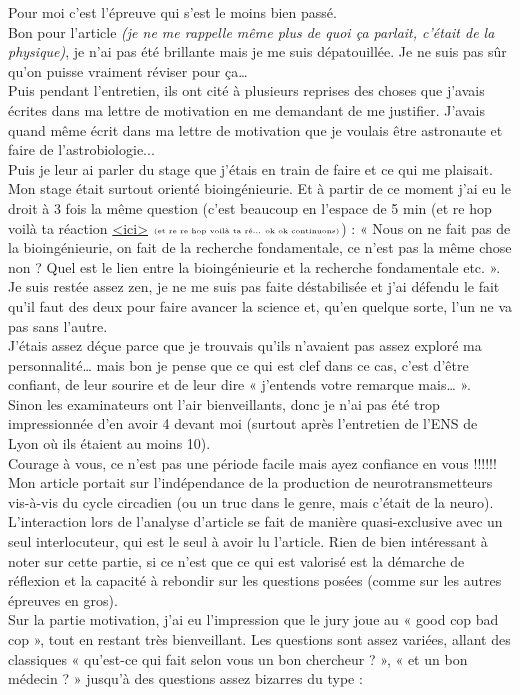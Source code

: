 \lettrine{{\color{yellow!80!black} \oldpilcrowfive}}{}
Pour moi c’est l’épreuve qui s’est le moins bien passé.\\
Bon pour l’article \textit{(je ne me rappelle même plus de quoi ça parlait, c’était de la physique)}, je n’ai pas été
brillante mais je me suis dépatouillée. Je ne suis pas sûr qu’on puisse vraiment réviser pour ça…\\
Puis pendant l’entretien, ils ont cité à plusieurs reprises des choses que j’avais écrites dans ma lettre de motivation en me demandant de me justifier. J’avais quand même écrit dans ma lettre de motivation que je voulais être astronaute et faire de l’astrobiologie... \\
Puis je leur ai parler du stage que j’étais en train de faire et ce qui me plaisait. Mon stage était surtout orienté bioingénieurie. Et à partir de ce moment j’ai eu le droit à 3 fois la même question (c’est beaucoup en l’espace de 5 min (et re hop voilà ta réaction \href{https://www.youtube.com/watch?v=6elK8VI1rPs}{<ici>} $\tiny \text{(et re re hop voilà ta ré... ok ok continuons)}$) : « Nous on ne fait pas de la bioingénieurie, on fait de la recherche fondamentale, ce n’est pas la même chose non ? Quel est le lien entre la bioingénieurie et la recherche fondamentale etc. ». \\
Je suis restée assez zen, je ne me suis pas faite déstabilisée et j’ai défendu le fait qu’il faut des deux pour faire avancer la science et, qu’en quelque sorte, l’un ne
va pas sans l’autre.\\
J’étais assez déçue parce que je trouvais qu’ils n’avaient pas assez exploré ma personnalité… mais bon je pense que ce qui est clef dans ce cas, c’est d’être confiant, de leur sourire et de leur dire « j’entends votre remarque mais… ».\\

Sinon les examinateurs ont l’air bienveillants, donc je n’ai pas été trop impressionnée d’en avoir 4
devant moi (surtout après l’entretien de l’ENS de Lyon où ils étaient au moins 10).\\

Courage à vous, ce n’est pas une période facile mais ayez confiance en vous !!!!!!\\

\lettrine{{\color{violet} \oldpilcrowfive}}{}
Mon article portait sur l’indépendance de la production de neurotransmetteurs vis-à-vis du cycle circadien (ou un truc dans le genre, mais c’était de la neuro).\\
L’interaction lors de l’analyse d’article se fait de manière quasi-exclusive avec un seul interlocuteur, qui est le seul à avoir lu l’article. Rien de bien intéressant à noter sur cette partie, si ce n’est que ce qui est valorisé est la démarche de réflexion et la capacité à rebondir sur les questions posées (comme sur les autres épreuves en gros). \\
Sur la partie motivation, j’ai eu l’impression que le jury joue au « good cop bad cop », tout en restant très bienveillant. Les questions sont assez variées, allant des classiques « qu’est-ce qui fait selon vous un bon chercheur ? », « et un bon médecin ? » jusqu’à des questions assez bizarres du type :

